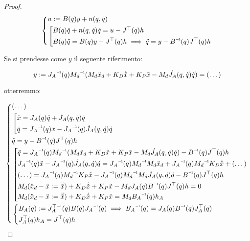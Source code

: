\begin{proof}

\[
	\left\{
	\begin{aligned}
	&u := B(q)y + n(q,\dot{q})\\
	&\left[
	\begin{aligned}
	&B(q)\ddot{q} + n(q,\dot{q})\dot{q} = u - J^\top(q)h\\
	&B(q)\ddot{q} = B(q)y - J^\top(q)h\implies \ddot{q}=y-\inv{B}(q)J^\top(q)h
	\end{aligned}
	\right.
	\end{aligned}
	\right.
\]

Se si prendesse come $y$ il seguente riferimento:

\[
	y := \inv{J_A}(q)\inv{M_d}(M_d\ddot{x}_d + K_D\dot{\tilde{x}} + K_P\tilde{x} - M_d\dot{J_A}(q,\dot{q})\dot{q}) = (\dots)
\]

otterremmo:

\[
	\left\{
	\begin{aligned}
	&(\dots)\\
	&\left[
	\begin{aligned}
	&\ddot{x} = J_A(q)\ddot{q} + \dot{J}_A(q,\dot{q})\dot{q}\\
	&\ddot{q} = \inv{J_A}(q)\ddot{x} - \inv{J_A}(q)\dot{J}_A(q,\dot{q})\dot{q}
	\end{aligned}
	\right.\\
	&\ddot{q}=y-\inv{B}(q)J^\top(q)h\\
	&\left[
	\begin{aligned}
	&\ddot{q} = \inv{J_A}(q)\inv{M_d}(M_d\ddot{x}_d + K_D\dot{\tilde{x}} + K_P\tilde{x} - M_d\dot{J_A}(q,\dot{q})\dot{q}) - \inv{B}(q)J^\top(q)h\\
	&\inv{J_A}(q)\ddot{x} - \inv{J_A}(q)\dot{J}_A(q,\dot{q})\dot{q} = \inv{J_A}(q)\inv{M_d}M_d\ddot{x}_d + \inv{J_A}(q)\inv{M_d}K_D\dot{\tilde{x}} + (\dots)\\
	&(\dots) =  \inv{J_A}(q)\inv{M_d}K_P\tilde{x} - \inv{J_A}(q)\inv{M_d}M_d\dot{J}_A(q,\dot{q})\dot{q} - \inv{B}(q)J^\top(q)h\\
	&M_d(\ddot{x}_d-\ddot{x}:=\ddot{\tilde{x}}) + K_D\dot{\tilde{x}} + K_P\tilde{x} - M_dJ_A(q)\inv{B}(q)J^\top(q)h = 0\\
	&M_d(\ddot{x}_d-\ddot{x}:=\ddot{\tilde{x}}) + K_D\dot{\tilde{x}} + K_P\tilde{x} = M_d\inv{B_A}(q)h_A
	\end{aligned}
	\right.\\	
	&\left\{
	\begin{aligned}
	&B_A(q) := \inv{J_A^\top}(q)B(q)\inv{J_A}(q) \implies \inv{B_A}(q) = J_A(q)\inv{B}(q)J_A^\top(q)\\
	&J_A^\top(q)h_A = J^\top(q)h
	\end{aligned}
	\right.
	\end{aligned}
	\right.
\]

\end{proof}

